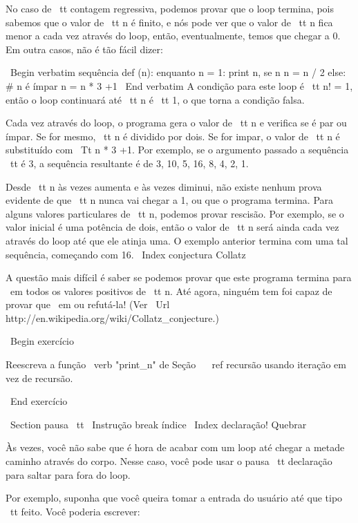 \documentclass[10pt]{book}
\begin{document}
\begin {itemize}
{{{{No caso de {\ tt contagem regressiva}, podemos provar que o loop
termina, pois sabemos que o valor de {\ tt n} é finito, e nós
pode ver que o valor de {\ tt n} fica menor a cada vez através do
loop, então, eventualmente, temos que chegar a 0. Em outra
casos, não é tão fácil dizer:

\ Begin {verbatim}
sequência def (n):
    enquanto n = 1:
        print n,
        se n%
            n = n / 2
        else: # n é ímpar
            n = n * 3 +1
\ End {verbatim}
%
A condição para este loop é {\ tt n! = 1}, então o loop continuará
até {\ tt n} é {\ tt 1}, o que torna a condição falsa.

Cada vez através do loop, o programa gera o valor de {\ tt n}
e verifica se é par ou ímpar. Se for mesmo, {\ tt n} é
dividido por dois. Se for impar, o valor de {\ tt n} é substituído com
{\ Tt n * 3 +1}. Por exemplo, se o argumento passado
a sequência {\ tt} é 3, a sequência resultante é de 3, 10, 5, 16, 8, 4, 2, 1.

Desde {\ tt n} às vezes aumenta e às vezes diminui, não existe nenhum
prova evidente de que {\ tt n} nunca vai chegar a 1, ou que o programa
termina. Para alguns valores particulares de {\ tt n}, podemos provar
rescisão. Por exemplo, se o valor inicial é uma potência de dois,
então o valor de {\ tt n} será ainda cada vez através do loop
até que ele atinja uma. O exemplo anterior termina com uma tal sequência,
começando com 16.
\ Index {conjectura Collatz}

A questão mais difícil é saber se podemos provar que este programa termina
para {\ em todos os valores positivos de} {\ tt n}. Até agora, ninguém tem
foi capaz de provar que {\ em ou} refutá-la! (Ver
  \ Url {http://en.wikipedia.org/wiki/Collatz_conjecture}.)

\ Begin {} exercício

Reescreva a função \ verb "print_n" de
Seção ~ \ ref {} recursão usando iteração em vez de recursão.

\ End {} exercício


\ Section {{pausa \ tt}}
\ {Instrução break} índice
\ Index {declaração! Quebrar}

Às vezes, você não sabe que é hora de acabar com um loop até chegar a metade
caminho através do corpo. Nesse caso, você pode usar o {pausa \ tt}
declaração para saltar para fora do loop.

Por exemplo, suponha que você queira tomar a entrada do usuário até que
tipo {\ tt feito}. Você poderia escrever:

}}}}
\end{itemize}
\end{document}
